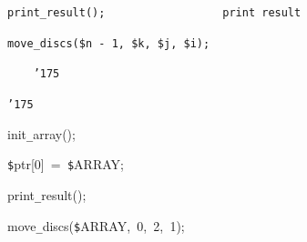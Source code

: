 \documentclass{article}
\begin{document}
\noindent
\mbox{}\tt\mc {\tt\mc \ \ \ \ \ \ \ \ }print{\tt\_}result();{\tt\mc \ \ \ \ \ \ \ \ \ \ \ \ \ \ \ \ \ }\rm\mc {\tt\#}\ print\ result

\noindent
\mbox{}\tt\mc {\tt\mc \ \ \ \ \ \ \ \ }move{\tt\_}discs({\tt\$}n{\tt\mc \ }{\tt -}{\tt\mc \ }1,{\tt\mc \ }{\tt\$}k,{\tt\mc \ }{\tt\$}j,{\tt\mc \ }{\tt\$}i);

\noindent
\mbox{}{\tt\mc \ \ \ \ }{\tt\char'175}

\noindent
\mbox{}{\tt\char'175}

\noindent
\mbox{}\hfill

\noindent
\mbox{}init{\tt\_}array();

\noindent
\mbox{}{\tt\$}ptr[0]{\tt\mc \ }={\tt\mc \ }{\tt\$}ARRAY;

\noindent
\mbox{}print{\tt\_}result();

\noindent
\mbox{}move{\tt\_}discs({\tt\$}ARRAY,{\tt\mc \ }0,{\tt\mc \ }2,{\tt\mc \ }1);

\noindent
\mbox{}

\rm\mc
\end{document}
